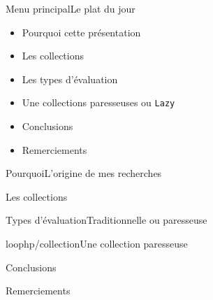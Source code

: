 





\begin{frame}[plain]
	\titlepage{}
\end{frame}

\newcommand\blankfootnote[1]{%
  \let\thefootnote\relax\footnotetext{#1}%
  \let\thefootnote\svthefootnote%
}

\begin{frame}{Menu principal}{Le plat du jour}
    \begin{itemize}
        \item Pourquoi cette présentation
        \item Les collections
        \item Les types d'évaluation
        \item Une collections paresseuses ou \texttt{Lazy}
        \item Conclusions
        \item Remerciements
    \end{itemize}
\end{frame}

\begin{frameD}{Pourquoi}{L'origine de mes recherches}

\end{frameD}



\begin{frameD}{Les collections}

\end{frameD}



\begin{frameD}{Types d'évaluation}{Traditionnelle ou paresseuse}

\end{frameD}



\begin{frameD}{loophp/collection}{Une collection paresseuse}

\end{frameD}



\begin{frameD}{Conclusions}

\end{frameD}



\begin{frameD}{Remerciements}

\end{frameD}




